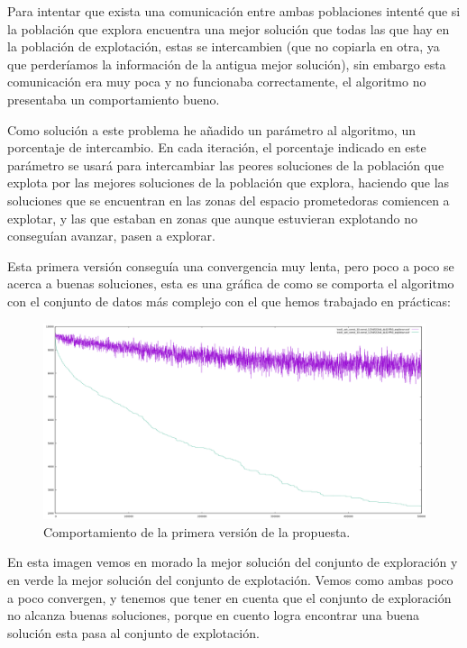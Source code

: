 \documentclass[12pt, spanish]{article}
\begin{document}
Para intentar que exista una comunicación entre ambas poblaciones intenté que si la población que explora encuentra una mejor solución que todas las que hay en la población de explotación, estas se intercambien (que no copiarla en otra, ya que perderíamos la información de la antigua mejor solución), sin embargo esta comunicación era muy poca y no funcionaba correctamente, el algoritmo no presentaba un comportamiento bueno.

Como solución a este problema he añadido un parámetro al algoritmo, un porcentaje de intercambio. En cada iteración, el porcentaje indicado en este parámetro se usará para intercambiar las peores soluciones de la población que explota por las mejores soluciones de la población que explora, haciendo que las soluciones que se encuentran en las zonas del espacio prometedoras comiencen a explotar, y las que estaban en zonas que aunque estuvieran explotando no conseguían avanzar, pasen a explorar.

Esta primera versión conseguía una convergencia muy lenta, pero poco a poco se acerca a buenas soluciones, esta es una gráfica de como se comporta el algoritmo con el conjunto de datos más complejo con el que hemos trabajado en prácticas:

\begin{figure}[H]
	\centering
	\includegraphics[scale = 0.33]{basico_sin_BL.png}
	
	\caption{Comportamiento de la primera versión de la propuesta.}
	\label{fig:basico_sin_BL}
\end{figure}

En esta imagen vemos en morado la mejor solución del conjunto de exploración y en verde la mejor solución del conjunto de explotación. Vemos como ambas poco a poco convergen, y tenemos que tener en  cuenta que el conjunto de exploración no alcanza buenas soluciones, porque en cuento logra encontrar una buena solución esta pasa al conjunto de explotación.
\end{document}
